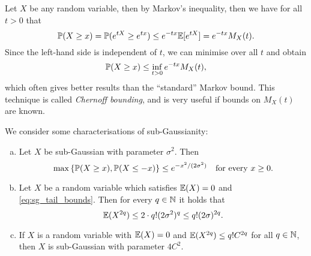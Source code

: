 \begin{discussion}
	Let $X$ be any random variable, then by Markov's inequality, then we have for all $t > 0$ that 
	\[
	\mathbb P(X \geq x) = \mathbb P(e^{tX} \geq e^{tx}) \leq e^{-tx} \mathbb E[e^{tX}] = e^{-tx} M_X(t).
	\]
	Since the left-hand side is independent of $t$, we can minimise over all $t$ and obtain \[
	\mathbb P(X \geq x) \leq \inf_{t > 0} e^{-tx} M_X(t), 
	\]
	which often gives better results than the ``standard'' Markov bound. This technique is called \emph{Chernoff bounding}, and is very useful if bounds on $M_X(t)$ are known. 
\end{discussion}
\begin{proposition}We consider some characterisations of sub-Gaussianity: 
    \begin{enumerate}[(a)]
        \item     Let $X$ be sub-Gaussian with parameter $\sigma^2$. Then 
        \begin{equation} \label{eq:sg_tail_bounds}
        \max\qty{\mathbb P(X \geq x), \mathbb P(X \leq -x)} \leq e^{-x^2/(2\sigma^2)} \quad\text{for every $x \geq 0$}.
        \end{equation}
        
        \item Let $X$ be a random variable which satisfies $\mathbb E(X) = 0$ and \cref{eq:sg_tail_bounds}. Then for every $q \in \mathbb N$ it holds that
        \[
        \mathbb E(X^{2q}) \leq 2 \cdot q! (2\sigma^2)^q \leq q! (2\sigma)^{2q}.
        \]
        
        \item If $X$ is a random variable with $\mathbb E(X) = 0$ and $\mathbb E(X^{2q}) \leq q! C^{2q}$ for all $q \in \mathbb N$, then $X$ is sub-Gaussian with parameter $4C^2$. 
    \end{enumerate}

\end{proposition}


